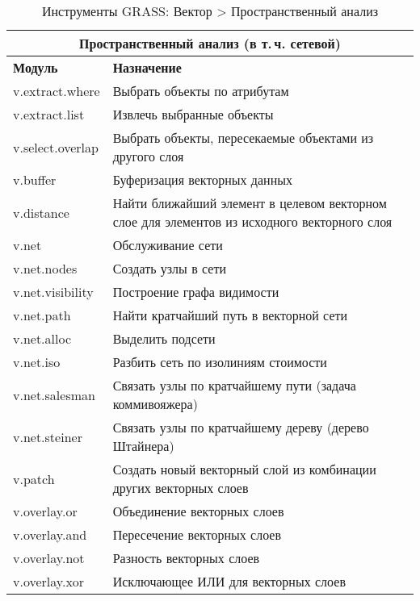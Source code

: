 {\renewcommand{\arraystretch}{0.7}
\begin{table}[H]
\centering
 \begin{tabular}{|p{4cm}|p{10cm}|}
  \hline \multicolumn{2}{|c|}{\textbf{Пространственный анализ (в т.\,ч. сетевой)}} \\
  \hline \textbf{Модуль} & \textbf{Назначение} \\
  \hline v.extract.where & Выбрать объекты по атрибутам \\
  \hline v.extract.list & Извлечь выбранные объекты \\
  \hline v.select.overlap & Выбрать объекты, пересекаемые объектами из
  другого слоя \\
  \hline v.buffer & Буферизация векторных данных \\
  \hline v.distance & Найти ближайший элемент в целевом векторном слое
  для элементов из исходного векторного слоя \\
  \hline v.net & Обслуживание сети \\
  \hline v.net.nodes & Создать узлы в сети \\
  \hline v.net.visibility & Построение графа видимости \\
  \hline v.net.path & Найти кратчайший путь в векторной сети \\
  \hline v.net.alloc & Выделить подсети \\
  \hline v.net.iso & Разбить сеть по изолиниям стоимости \\
  \hline v.net.salesman & Связать узлы по кратчайшему пути (задача коммивояжера) \\
  \hline v.net.steiner & Связать узлы по кратчайшему дереву (дерево Штайнера) \\
  \hline v.patch & Создать новый векторный слой из комбинации других
  векторных слоев \\
  \hline v.overlay.or & Объединение векторных слоев \\
  \hline v.overlay.and & Пересечение векторных слоев \\
  \hline v.overlay.not & Разность векторных слоев \\
  \hline v.overlay.xor & Исключающее ИЛИ для векторных слоев \\
\hline
\end{tabular}
\caption{Инструменты GRASS: Вектор > Пространственный анализ}
\end{table}}

